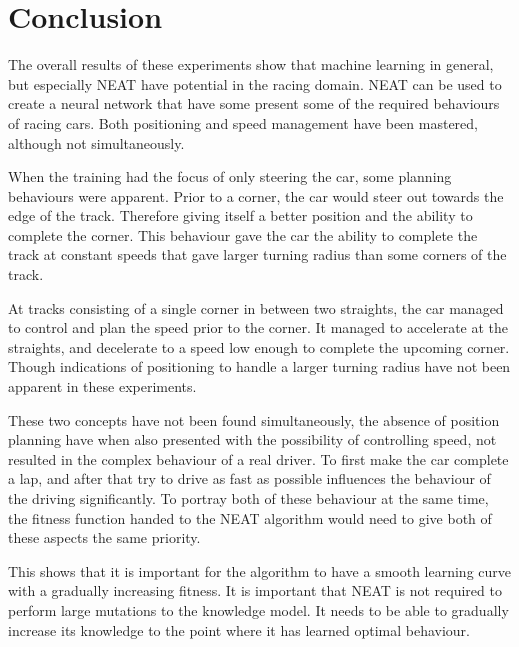 \section{Conclusion}
\label{conclusion}
The overall results of these experiments show that machine learning in general, but especially NEAT have potential in the racing domain. NEAT can be used to create a neural network that have some present some of the required behaviours of racing cars. Both positioning and speed management have been mastered, although not simultaneously.

When the training had the focus of only steering the car, some planning behaviours were apparent. Prior to a corner, the car would steer out towards the edge of the track. Therefore giving itself a better position and the ability to complete the corner. This behaviour gave the car the ability to complete the track at constant speeds that gave larger turning radius than some corners of the track.

At tracks consisting of a single corner in between two straights, the car managed to control and plan the speed prior to the corner. It managed to accelerate at the straights, and decelerate to a speed low enough to complete the upcoming corner. Though indications of positioning to handle a larger turning radius have not been apparent in these experiments.

These two concepts have not been found simultaneously, the absence of position planning have when also presented with the possibility of controlling speed, not resulted in the complex behaviour of a real driver. To first make the car complete a lap, and after that try to drive as fast as possible influences the behaviour of the driving significantly. To portray both of these behaviour at the same time, the fitness function handed to the NEAT algorithm would need to give both of these aspects the same priority.

This shows that it is important for the algorithm to have a smooth learning curve with a gradually increasing fitness. It is important that NEAT is not required to perform large mutations to the knowledge model. It needs to be able to gradually increase its knowledge to the point where it has learned optimal behaviour.


